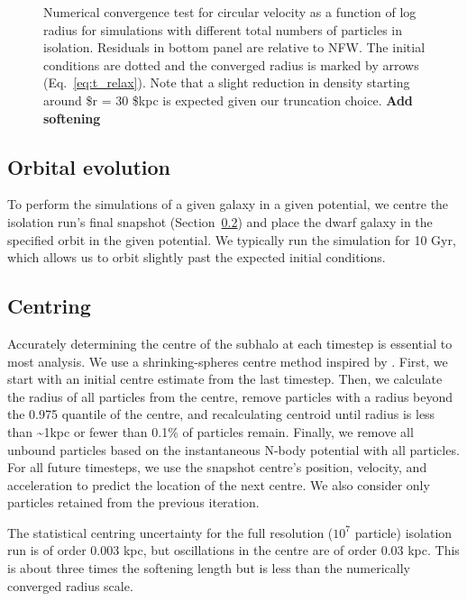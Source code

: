 \begin{figure}
\centering
{}
\caption[Numerical halo convergence]{Numerical convergence test for
circular velocity as a function of log radius for simulations with
different total numbers of particles in isolation. Residuals in bottom
panel are relative to NFW. The initial conditions are dotted and the
converged radius is marked by arrows (Eq.~\ref{eq:t_relax}). Note that a
slight reduction in density starting around \$r = 30 \$kpc is expected
given our truncation choice. \textbf{Add
softening}}\label{fig:numerical_convergence}
\end{figure}

\subsection{Orbital evolution}\label{orbital-evolution}

To perform the simulations of a given galaxy in a given potential, we
centre the isolation run's final snapshot
(Section~\ref{sec:shrinking_spheres}) and place the dwarf galaxy in the
specified orbit in the given potential. We typically run the simulation
for 10 Gyr, which allows us to orbit slightly past the expected initial
conditions.

\subsection{Centring}\label{sec:shrinking_spheres}

Accurately determining the centre of the subhalo at each timestep is
essential to most analysis. We use a shrinking-spheres centre method
inspired by \citet{power+2003}. First, we start with an initial centre
estimate from the last timestep. Then, we calculate the radius of all
particles from the centre, remove particles with a radius beyond the
0.975 quantile of the centre, and recalculating centroid until radius is
less than \textasciitilde1kpc or fewer than 0.1\% of particles remain.
Finally, we remove all unbound particles based on the instantaneous
N-body potential with all particles. For all future timesteps, we use
the snapshot centre's position, velocity, and acceleration to predict
the location of the next centre. We also consider only particles
retained from the previous iteration.

The statistical centring uncertainty for the full resolution (\(10^7\)
particle) isolation run is of order 0.003 kpc, but oscillations in the
centre are of order 0.03 kpc. This is about three times the softening
length but is less than the numerically converged radius scale.

